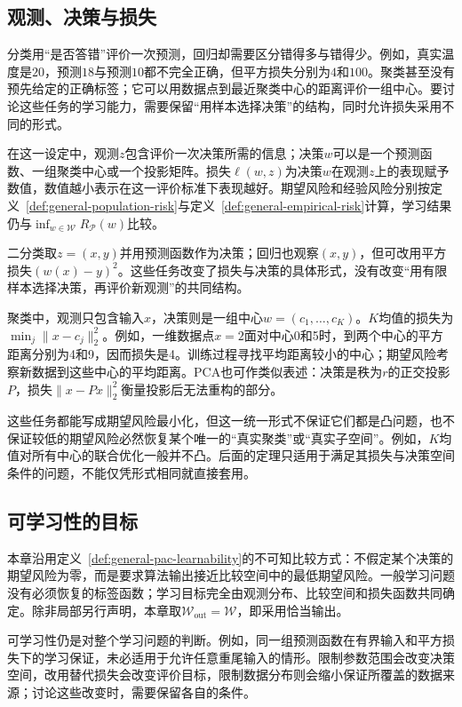 \subsection{观测、决策与损失}

分类用“是否答错”评价一次预测，回归却需要区分错得多与错得少。例如，真实温度是$20$，预测$18$与预测$10$都不完全正确，但平方损失分别为$4$和$100$。聚类甚至没有预先给定的正确标签；它可以用数据点到最近聚类中心的距离评价一组中心。要讨论这些任务的学习能力，需要保留“用样本选择决策”的结构，同时允许损失采用不同的形式。

在这一设定中，观测$z$包含评价一次决策所需的信息；决策$w$可以是一个预测函数、一组聚类中心或一个投影矩阵。损失$\ell(w,z)$为决策$w$在观测$z$上的表现赋予数值，数值越小表示在这一评价标准下表现越好。期望风险和经验风险分别按定义~\ref{def:general-population-risk}与定义~\ref{def:general-empirical-risk}计算，学习结果仍与$\inf_{w\in\mathcal W}R_{\mathcal P}(w)$比较。

二分类取$z=(x,y)$并用预测函数作为决策；回归也观察$(x,y)$，但可改用平方损失$(w(x)-y)^2$。这些任务改变了损失与决策的具体形式，没有改变“用有限样本选择决策，再评价新观测”的共同结构。

聚类中，观测只包含输入$x$，决策则是一组中心$w=(c_1,\ldots,c_K)$。$K$均值的损失为$\min_j\|x-c_j\|_2^2$。例如，一维数据点$x=2$面对中心0和5时，到两个中心的平方距离分别为4和9，因而损失是4。训练过程寻找平均距离较小的中心；期望风险考察新数据到这些中心的平均距离。PCA也可作类似表述：决策是秩为$r$的正交投影$P$，损失$\|x-Px\|_2^2$衡量投影后无法重构的部分。

这些任务都能写成期望风险最小化，但这一统一形式不保证它们都是凸问题，也不保证较低的期望风险必然恢复某个唯一的“真实聚类”或“真实子空间”。例如，$K$均值对所有中心的联合优化一般并不凸。后面的定理只适用于满足其损失与决策空间条件的问题，不能仅凭形式相同就直接套用。

\subsection{可学习性的目标}

本章沿用定义~\ref{def:general-pac-learnability}的不可知比较方式：不假定某个决策的期望风险为零，而是要求算法输出接近比较空间中的最低期望风险。一般学习问题没有必须恢复的标签函数；学习目标完全由观测分布、比较空间和损失函数共同确定。除非局部另行声明，本章取$\mathcal W_{\mathrm{out}}=\mathcal W$，即采用恰当输出。

可学习性仍是对整个学习问题的判断。例如，同一组预测函数在有界输入和平方损失下的学习保证，未必适用于允许任意重尾输入的情形。限制参数范围会改变决策空间，改用替代损失会改变评价目标，限制数据分布则会缩小保证所覆盖的数据来源；讨论这些改变时，需要保留各自的条件。

